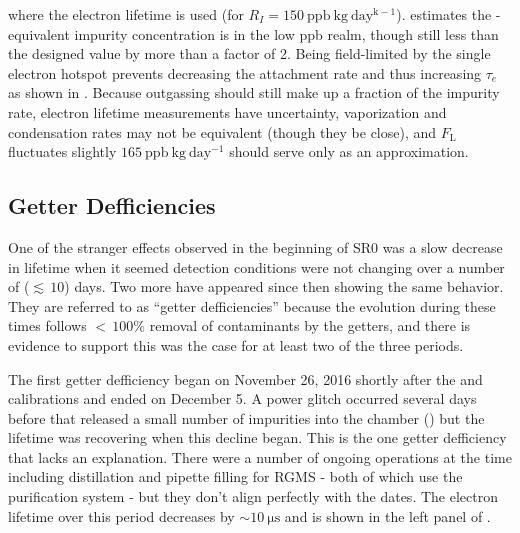 \noindent where the \alphadecay electron lifetime is used (for
\metakr $R_I = 150\ \mathrm{ppb\ kg\ day^{k-1}}$).   estimates the -equivalent
impurity concentration is in the low ppb realm, though still less than the designed value by more than a factor of 2.  Being field-limited
by the single electron hotspot prevents decreasing the attachment rate and thus increasing $\tau_e$ as shown in
.  Because outgassing should still make up a fraction
of the impurity rate, electron lifetime measurements
have uncertainty, vaporization and condensation rates may not be equivalent (though they be close), and $F_{\mathrm{L}}$ fluctuates
slightly $165\ \mathrm{ppb\ kg\ day^{-1}}$ should serve only as an approximation.



\subsection{Getter Defficiencies}
\label{subsec:electron_lifetime_model_detector_effects_getter}
One of the stranger effects observed in the beginning of SR0 was a slow decrease in lifetime when it seemed detection conditions were not
changing over a number of (${\lesssim}\, 10$) days.  Two more have appeared since then showing the same behavior.  They are referred to
as ``getter defficiencies'' because the evolution during these times follows ${<}\, 100\%$ removal of
contaminants by the getters, and there is evidence to support this was the case for at least two of the three periods.

The first getter defficiency
began on November 26, 2016 shortly after the \ambe and \metakr calibrations and ended on December 5.  A power glitch occurred several
days before that released a small number of impurities into the chamber
() but the lifetime was recovering when this decline
began.  This is the one getter defficiency that lacks an explanation.  There were a number of ongoing operations
at the time including  distillation and pipette filling for RGMS - both of which use the purification system - but they don't
align perfectly with the dates.  The electron lifetime over this period decreases by ${\sim}10\ \mathrm{\mu s}$ and is shown in the left
panel of .

